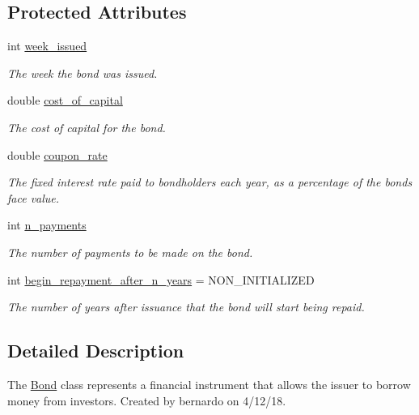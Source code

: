 \subsection*{Protected Attributes}
\begin{DoxyCompactItemize}
\item 
int \mbox{\hyperlink{classBond_a30d48d158cbbd9c7b4bfa0012c89590a}{week\+\_\+issued}}
\begin{DoxyCompactList}\small\item\em The week the bond was issued. \end{DoxyCompactList}\item 
double \mbox{\hyperlink{classBond_ad98df7d28b398e620286f95ee085439b}{cost\+\_\+of\+\_\+capital}}
\begin{DoxyCompactList}\small\item\em The cost of capital for the bond. \end{DoxyCompactList}\item 
double \mbox{\hyperlink{classBond_a5f66785534e24caa43d9f730130a6463}{coupon\+\_\+rate}}
\begin{DoxyCompactList}\small\item\em The fixed interest rate paid to bondholders each year, as a percentage of the bond\textquotesingle{}s face value. \end{DoxyCompactList}\item 
int \mbox{\hyperlink{classBond_a4a227b6de2eeada118d82ab1633b1db8}{n\+\_\+payments}}
\begin{DoxyCompactList}\small\item\em The number of payments to be made on the bond. \end{DoxyCompactList}\item 
int \mbox{\hyperlink{classBond_a8d808753f9708e841dfceca72a110737}{begin\+\_\+repayment\+\_\+after\+\_\+n\+\_\+years}} = N\+O\+N\+\_\+\+I\+N\+I\+T\+I\+A\+L\+I\+Z\+ED
\begin{DoxyCompactList}\small\item\em The number of years after issuance that the bond will start being repaid. \end{DoxyCompactList}\end{DoxyCompactItemize}


\subsection{Detailed Description}
The {\ttfamily \mbox{\hyperlink{classBond}{Bond}}} class represents a financial instrument that allows the issuer to borrow money from investors. Created by bernardo on 4/12/18. 

